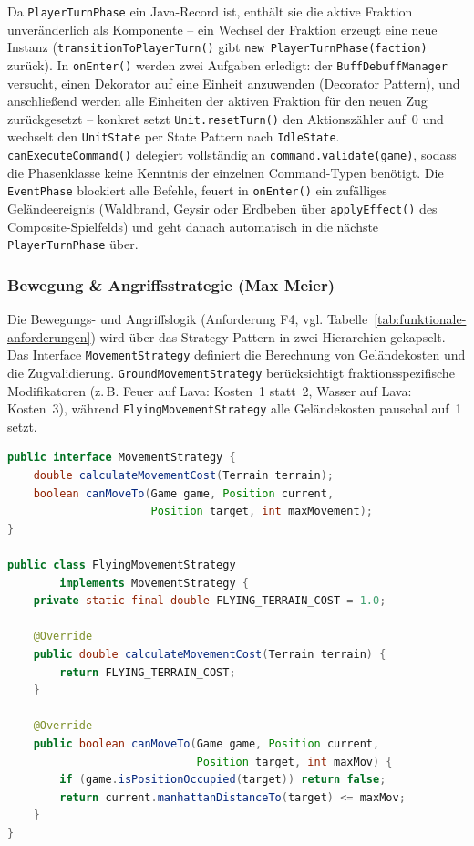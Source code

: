 Da \texttt{PlayerTurnPhase} ein Java-Record ist, enthält sie die aktive Fraktion unveränderlich als Komponente -- ein Wechsel der Fraktion erzeugt eine neue Instanz (\texttt{transitionToPlayerTurn()} gibt \texttt{new PlayerTurnPhase(faction)} zurück).
In \texttt{onEnter()} werden zwei Aufgaben erledigt: der \texttt{BuffDebuffManager} versucht, einen Dekorator auf eine Einheit anzuwenden (Decorator Pattern), und anschließend werden alle Einheiten der aktiven Fraktion für den neuen Zug zurückgesetzt -- konkret setzt \texttt{Unit.resetTurn()} den Aktionszähler auf~0 und wechselt den \texttt{UnitState} per State Pattern nach \texttt{IdleState}.
\texttt{canExecuteCommand()} delegiert vollständig an \texttt{command.validate(game)}, sodass die Phasenklasse keine Kenntnis der einzelnen Command-Typen benötigt.
Die \texttt{EventPhase} blockiert alle Befehle, feuert in \texttt{onEnter()} ein zufälliges Geländeereignis (Waldbrand, Geysir oder Erdbeben über \texttt{applyEffect()} des Composite-Spielfelds) und geht danach automatisch in die nächste \texttt{PlayerTurnPhase} über.



\subsubsection{Bewegung \& Angriffsstrategie (Max Meier)}
\label{subsec:bewegung-angriffsstrategie}

Die Bewegungs- und Angriffslogik (Anforderung F4, vgl. Tabelle~\ref{tab:funktionale-anforderungen}) wird über das Strategy Pattern in zwei Hierarchien gekapselt.
Das Interface \texttt{MovementStrategy} definiert die Berechnung von Geländekosten und die Zugvalidierung.
\texttt{GroundMovementStrategy} berücksichtigt fraktionsspezifische Modifikatoren (z.\,B. Feuer auf Lava: Kosten~1 statt~2, Wasser auf Lava: Kosten~3),
während \texttt{FlyingMovementStrategy} alle Geländekosten pauschal auf~1 setzt.

\begin{lstlisting}[language=Java, caption={Strategy Pattern -- MovementStrategy und FlyingMovementStrategy}, label={lst:strategy-movement}]
public interface MovementStrategy {
    double calculateMovementCost(Terrain terrain);
    boolean canMoveTo(Game game, Position current,
                      Position target, int maxMovement);
}

public class FlyingMovementStrategy
        implements MovementStrategy {
    private static final double FLYING_TERRAIN_COST = 1.0;

    @Override
    public double calculateMovementCost(Terrain terrain) {
        return FLYING_TERRAIN_COST;
    }

    @Override
    public boolean canMoveTo(Game game, Position current,
                             Position target, int maxMov) {
        if (game.isPositionOccupied(target)) return false;
        return current.manhattanDistanceTo(target) <= maxMov;
    }
}
\end{lstlisting}

